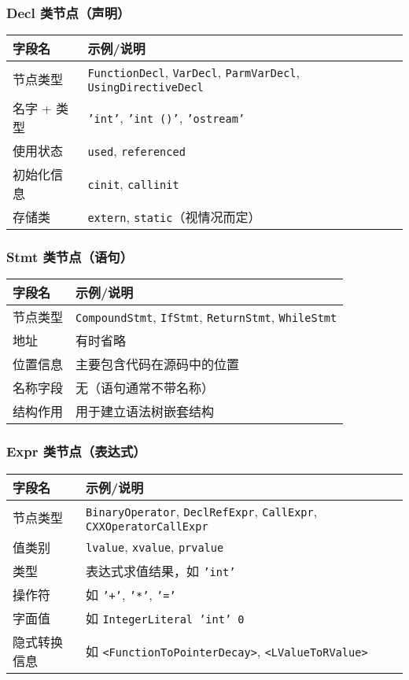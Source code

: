 \documentclass[UTF8,a4paper,10pt]{ctexart}
\begin{document}
\subsubsection*{Decl 类节点（声明）}
\begin{tabular}{@{}ll@{}}
\toprule
字段名       & 示例/说明 \\ \midrule
节点类型     & \texttt{FunctionDecl}, \texttt{VarDecl}, \texttt{ParmVarDecl}, \texttt{UsingDirectiveDecl} \\
名字 + 类型 & \texttt{'int'}, \texttt{'int ()'}, \texttt{'ostream'} \\
使用状态     & \texttt{used}, \texttt{referenced} \\
初始化信息   & \texttt{cinit}, \texttt{callinit} \\
存储类       & \texttt{extern}, \texttt{static}（视情况而定） \\
\bottomrule
\end{tabular}

\vspace{1em}

\subsubsection*{Stmt 类节点（语句）}
\begin{tabular}{@{}ll@{}}
\toprule
字段名     & 示例/说明 \\ \midrule
节点类型   & \texttt{CompoundStmt}, \texttt{IfStmt}, \texttt{ReturnStmt}, \texttt{WhileStmt} \\
地址       & 有时省略 \\
位置信息   & 主要包含代码在源码中的位置 \\
名称字段   & 无（语句通常不带名称） \\
结构作用   & 用于建立语法树嵌套结构 \\
\bottomrule
\end{tabular}

\vspace{1em}

\subsubsection*{Expr 类节点（表达式）}
\begin{tabular}{@{}ll@{}}
\toprule
字段名       & 示例/说明 \\ \midrule
节点类型     & \texttt{BinaryOperator}, \texttt{DeclRefExpr}, \texttt{CallExpr}, \texttt{CXXOperatorCallExpr} \\
值类别       & \texttt{lvalue}, \texttt{xvalue}, \texttt{prvalue} \\
类型         & 表达式求值结果，如 \texttt{'int'} \\
操作符       & 如 \texttt{'+'}, \texttt{'*'}, \texttt{'='} \\
字面值       & 如 \texttt{IntegerLiteral 'int' 0} \\
隐式转换信息 & 如 \texttt{<FunctionToPointerDecay>}, \texttt{<LValueToRValue>} \\
\bottomrule
\end{tabular}
\end{document}
